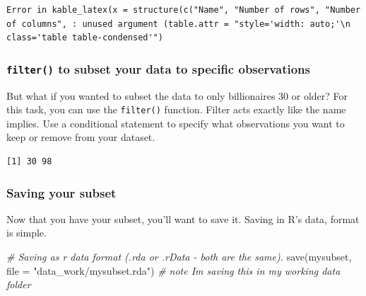 \documentclass[
]{book}
\newenvironment{Shaded}{\begin{snugshade}}{\end{snugshade}}
\newcommand{\AttributeTok}[1]{\textcolor[rgb]{0.77,0.63,0.00}{#1}}
\newcommand{\CommentTok}[1]{\textcolor[rgb]{0.56,0.35,0.01}{\textit{#1}}}
\newcommand{\DecValTok}[1]{\textcolor[rgb]{0.00,0.00,0.81}{#1}}
\newcommand{\FunctionTok}[1]{\textcolor[rgb]{0.00,0.00,0.00}{#1}}
\newcommand{\NormalTok}[1]{#1}
\newcommand{\OtherTok}[1]{\textcolor[rgb]{0.56,0.35,0.01}{#1}}
\newcommand{\SpecialCharTok}[1]{\textcolor[rgb]{0.00,0.00,0.00}{#1}}
\newcommand{\StringTok}[1]{\textcolor[rgb]{0.31,0.60,0.02}{#1}}
\begin{document}
\begin{verbatim}
Error in kable_latex(x = structure(c("Name", "Number of rows", "Number of columns", : unused argument (table.attr = "style='width: auto;'\n        class='table table-condensed'")
\end{verbatim}

\hypertarget{filter}{%
\subsubsection*{\texorpdfstring{\texttt{filter()} to subset your data to specific observations}{filter() to subset your data to specific observations}}\label{filter}}

But what if you wanted to subset the data to only billionaires 30 or older? For this task, you can use the \texttt{filter()} function. Filter acts exactly like the name implies. Use a conditional statement to specify what observations you want to keep or remove from your dataset.

\begin{Shaded}
\end{Shaded}

\begin{verbatim}
[1] 30 98
\end{verbatim}

\hypertarget{save}{%
\subsubsection*{Saving your subset}\label{save}}

Now that you have your subset, you'll want to save it. Saving in R's data, format is simple.

\begin{Shaded}
\begin{Highlighting}[]
\CommentTok{\# Saving as r data format (.rda or .rData {-} both are the same).}
\FunctionTok{save}\NormalTok{(mysubset, }\AttributeTok{file =} \StringTok{"data\_work/mysubset.rda"}\NormalTok{) }\CommentTok{\# note I\textquotesingle{}m saving this in my working data folder}
\end{Highlighting}
\end{Shaded}
\end{document}
